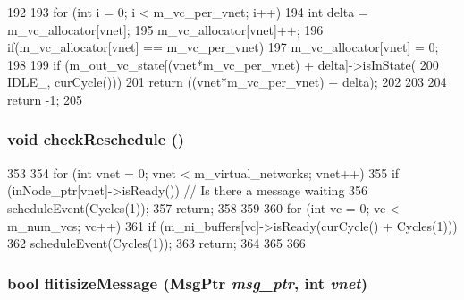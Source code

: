 \begin{DoxyCode}
192 {
193         for (int i = 0; i < m_vc_per_vnet; i++) {
194                 int delta = m_vc_allocator[vnet];
195                 m_vc_allocator[vnet]++;
196                 if(m_vc_allocator[vnet] == m_vc_per_vnet)
197                         m_vc_allocator[vnet] = 0;
198 
199                 if (m_out_vc_state[(vnet*m_vc_per_vnet) + delta]->isInState(
200                     IDLE_, curCycle())) {
201                         return ((vnet*m_vc_per_vnet) + delta);
202                 }
203         }
204         return -1;
205 }
\end{DoxyCode}
\hypertarget{classNetworkInterface__d_af954e8e2150e2ce2e1b87081bbd9c678}{
\subsubsection[{checkReschedule}]{\setlength{\rightskip}{0pt plus 5cm}void checkReschedule ()}}
\label{classNetworkInterface__d_af954e8e2150e2ce2e1b87081bbd9c678}



\begin{DoxyCode}
353 {
354     for (int vnet = 0; vnet < m_virtual_networks; vnet++) {
355         if (inNode_ptr[vnet]->isReady()) { // Is there a message waiting
356             scheduleEvent(Cycles(1));
357             return;
358         }
359     }
360     for (int vc = 0; vc < m_num_vcs; vc++) {
361         if (m_ni_buffers[vc]->isReady(curCycle() + Cycles(1))) {
362             scheduleEvent(Cycles(1));
363             return;
364         }
365     }
366 }
\end{DoxyCode}
\hypertarget{classNetworkInterface__d_a12a9945591ab6cd27b4cf0df84786cf8}{
\subsubsection[{flitisizeMessage}]{\setlength{\rightskip}{0pt plus 5cm}bool flitisizeMessage ({\bf MsgPtr} {\em msg\_\-ptr}, \/  int {\em vnet})}}
\label{classNetworkInterface__d_a12a9945591ab6cd27b4cf0df84786cf8}



